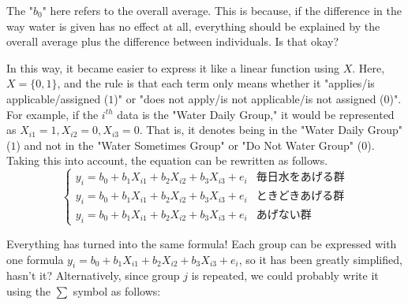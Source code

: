 \documentclass{ltjbook}
\begin{document}
The "$b_0$" here refers to the overall average. This is because, if the difference in the way water is given has no effect at all, everything should be explained by the overall average plus the difference between individuals. Is that okay?


In this way, it became easier to express it like a linear function using $X$. Here, $X = \{0,1\}$, and the rule is that each term only means whether it "applies/is applicable/assigned ($1$)" or "does not apply/is not applicable/is not assigned ($0$)".
For example, if the $i^{th}$ data is the "Water Daily Group," it would be represented as $X_{i1}=1, X_{i2}=0, X_{i3}=0$. That is, it denotes being in the "Water Daily Group" ($1$) and not in the "Water Sometimes Group" or "Do Not Water Group" ($0$). Taking this into account, the equation can be rewritten as follows.
\[
	\label{eq13_01b}
	\begin{cases}
		y_{i} = b_0 + b_1X_{i1} + b_2X_{i2} + b_3X_{i3} + e_{i} & \mbox{毎日水をあげる群} \\
		y_{i} = b_0 + b_1X_{i1} + b_2X_{i2} + b_3X_{i3} + e_{i} & \mbox{ときどきあげる群} \\
		y_{i} = b_0 + b_1X_{i1} + b_2X_{i2} + b_3X_{i3} + e_{i} & \mbox{あげない群}
	\end{cases}
\]

Everything has turned into the same formula! Each group can be expressed with one formula $y_{i} = b_0 + b_1X_{i1} + b_2X_{i2} + b_3X_{i3} + e_i$, so it has been greatly simplified, hasn't it?
Alternatively, since group $j$ is repeated, we could probably write it using the $\sum$ symbol as follows:
\end{document}
